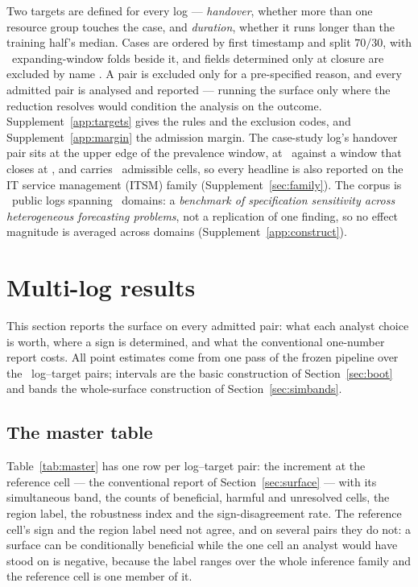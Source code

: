 \documentclass[11pt,3p,review,authoryear]{elsarticle}
\theoremstyle{definition}
\begin{document}
Two targets are defined for every log --- \emph{handover}, whether more than
one resource group touches the case, and \emph{duration}, whether it runs
longer than the training half's median. Cases are ordered by first timestamp
and split $70/30$, with \nFolds\ expanding-window folds beside it, and fields
determined only at closure are excluded by name
\citep{kaufman2012leakage,kapoor2023leakage,weytjens2022leakage}. A pair is
excluded only for a pre-specified reason, and every admitted pair is
analysed and reported --- running the surface only where the reduction
resolves would condition the analysis on the outcome.
Supplement~\ref{app:targets} gives the rules and the exclusion codes, and
Supplement~\ref{app:margin} the admission margin. The case-study log's
handover pair sits at the upper edge of the prevalence window, at
\prevAdmittedMax\ against a window that closes at \prevHi, and carries
\nCellsBpicFourteenHandover\ admissible cells, so every headline is also
reported on the IT service management (ITSM) family
(Supplement~\ref{sec:family}). The corpus is \nLogs\ public logs spanning
\nDomains\ domains: a \emph{benchmark of specification sensitivity across
heterogeneous forecasting problems}, not a replication of one finding, so no
effect magnitude is averaged across domains
(Supplement~\ref{app:construct}).

\section{Multi-log results}
\label{sec:multilog}

\label{sec:denominator}
This section reports the surface on every admitted pair: what each analyst
choice is worth, where a sign is determined, and what the conventional
one-number report costs. All point estimates come from one pass of the frozen
pipeline over the \nPairs\ log--target pairs; intervals are the basic
construction of Section~\ref{sec:boot} and bands the whole-surface
construction of Section~\ref{sec:simbands}.

\subsection{The master table}



Table~\ref{tab:master} has one row per log--target pair: the increment at the
reference cell --- the conventional report of Section~\ref{sec:surface} ---
with its simultaneous band, the counts of beneficial, harmful and unresolved
cells, the region label, the robustness index and the sign-disagreement rate.
The reference cell's sign and the region label need not agree, and on
several pairs they do not: a surface can be conditionally beneficial while
the one cell an analyst would have stood on is negative, because the label
ranges over the whole inference family and the reference cell is one member
of it.
\end{document}

